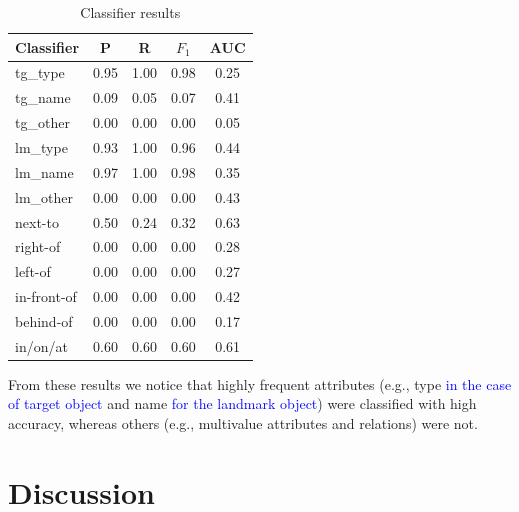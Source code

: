 \documentclass[11pt]{article}
\begin{document}
\begin{table}[ht]
\begin{center}
\footnotesize{
\caption{Classifier results}
\begin{tabular}{l c c c c }
\hline
{{Classifier}}	& {P} & {R} & {$F_{1}$} & {AUC} \\
\hline
{{tg\_type}} 			& 0.95 & 1.00 & 0.98 & 0.25 \\
{{tg\_name}}			& 0.09 & 0.05 & 0.07 & 0.41 \\
{{tg\_other}}			& 0.00 & 0.00 & 0.00 & 0.05 \\                               
{{lm\_type}}			& 0.93 & 1.00 & 0.96 & 0.44 \\                               
{{lm\_name}}			& 0.97 & 1.00 & 0.98 & 0.35 \\                               
{{lm\_other}}			& 0.00 & 0.00 & 0.00 & 0.43 \\                               
{{next-to}}				& 0.50 & 0.24 & 0.32 & 0.63 \\                               
{{right-of}}			& 0.00 & 0.00 & 0.00 & 0.28 \\                               
{{left-of}}				& 0.00 & 0.00 & 0.00 & 0.27 \\                               
{{in-front-of}}		& 0.00 & 0.00 & 0.00 & 0.42 \\                               
{{behind-of}}			& 0.00 & 0.00 & 0.00 & 0.17 \\                               
{{in/on/at}} 			& 0.60 & 0.60 & 0.60 & 0.61 \\                               
\hline                   
\end{tabular}
\label{tab-svm-results}
}
\end{center}
\end{table}
\normalsize

From these results we notice that highly frequent attributes (e.g., type \textcolor{blue}{in the case of target object} and name \textcolor{blue}{for the landmark object}) were classified  with high accuracy, whereas others (e.g., multivalue attributes and relations) were not. 

\section{Discussion}
\label{sec-final}
\end{document}
